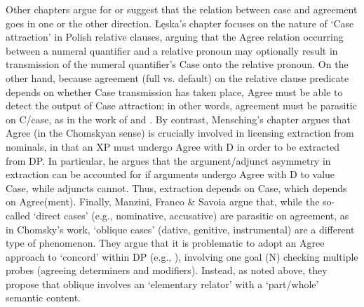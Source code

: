 \documentclass[output=paper]{langsci/langscibook}
\begin{document}
Other chapters argue for or suggest that the relation between case and agreement goes in one or the other direction. Łęska’s chapter focuses on the nature of ‘Case attraction’ in Polish relative clauses, arguing that the Agree relation occurring between a numeral quantifier and a relative pronoun may optionally result in transmission of the numeral quantifier’s Case onto the relative pronoun. On the other hand, because agreement (full vs. default) on the relative clause predicate depends on whether Case transmission has taken place, Agree must be able to detect the output of Case attraction; in other words, agreement must be parasitic on C/case, as in the work of \citet{Marantz1991} and \citet{Preminger2014}. By contrast, Mensching’s chapter argues that Agree (in the Chomskyan sense) is crucially involved in licensing extraction from nominals, in that an XP must undergo Agree with D in order to be extracted from DP. In particular, he argues that the argument/adjunct asymmetry in extraction can be accounted for if arguments undergo Agree with D to value Case, while adjuncts cannot. Thus, extraction depends on Case, which depends on Agree(ment). Finally, Manzini, Franco \& Savoia argue that, while the so-called ‘direct cases’ (e.g., nominative, accusative) are parasitic on agreement, as in Chomsky’s work, ‘oblique cases’ (dative, genitive, instrumental) are a different type of phenomenon. They argue that it is problematic to adopt an Agree approach to ‘concord’ within DP (e.g., \citealt{Carstens2001}), involving one goal (N) checking multiple probes (agreeing determiners and modifiers). Instead, as noted above, they propose that oblique involves an ‘elementary relator’ with a ‘part/whole’ semantic content.
\end{document}
